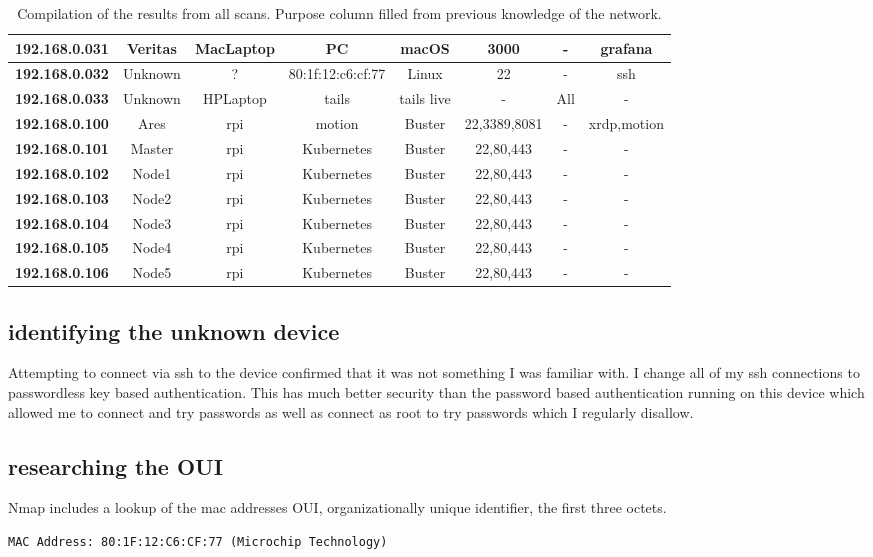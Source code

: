 \documentclass[10pt]{article}
\begin{document}
\begin{table}[H]
\begin{center}
\begin{tabular}{ | c | c | c | c | c | c | c | c | }
   \hline
   \textbf{192.168.0.031} & Veritas & MacLaptop & PC & macOS & 3000 & - & grafana \\
   \hline
   \textbf{192.168.0.032} & Unknown & ? & 80:1f:12:c6:cf:77 & Linux & 22 & - & ssh \\
   \hline
   \textbf{192.168.0.033} & Unknown & HPLaptop & tails & tails live & - & All & - \\  
   \hline
   \textbf{192.168.0.100}  & Ares & rpi & motion & Buster & 22,3389,8081 & - & xrdp,motion \\  
   \hline
   \textbf{192.168.0.101}  & Master & rpi & Kubernetes & Buster & 22,80,443 & - & - \\  
   \hline
   \textbf{192.168.0.102}  & Node1 & rpi & Kubernetes & Buster & 22,80,443 & - & - \\  
   \hline
   \textbf{192.168.0.103}  & Node2 & rpi & Kubernetes & Buster & 22,80,443 & - & - \\  
   \hline
   \textbf{192.168.0.104}  & Node3 & rpi & Kubernetes & Buster & 22,80,443 & - & - \\  
   \hline
   \textbf{192.168.0.105}  & Node4 & rpi & Kubernetes & Buster & 22,80,443 & - & - \\  
   \hline
   \textbf{192.168.0.106}  & Node5 & rpi & Kubernetes & Buster & 22,80,443 & - & - \\  
   \hline
  \end{tabular}
  \caption{Compilation of the results from all scans. Purpose column filled from previous knowledge of the network.}
  \label{local table}
  \end{center}
  \end{table}

\subsection*{identifying the unknown device}
Attempting to connect via ssh to the device confirmed that it was not something I was familiar with. I change all of my ssh
connections to passwordless key based authentication. This has much better security than the password based authentication
running on this device which allowed me to connect and try passwords as well as connect as root to try passwords which 
I regularly disallow.

\subsection*{researching the OUI}
Nmap includes a lookup of the mac addresses OUI, organizationally unique identifier, the first three octets.
\begin{verbatim}
MAC Address: 80:1F:12:C6:CF:77 (Microchip Technology)
\end{verbatim}
\end{document}
